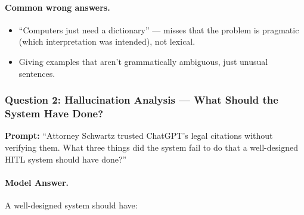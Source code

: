 \paragraph{Common wrong answers.}
\begin{itemize}
    \item ``Computers just need a dictionary'' --- misses that the problem is pragmatic (which interpretation was intended), not lexical.
    \item Giving examples that aren't grammatically ambiguous, just unusual sentences.
\end{itemize}

\subsubsection{Question 2: Hallucination Analysis --- What Should the System Have Done?}

\textbf{Prompt:} ``Attorney Schwartz trusted ChatGPT's legal citations without verifying them. What three things did the system fail to do that a well-designed HITL system should have done?''

\paragraph{Model Answer.}

A well-designed system should have:

